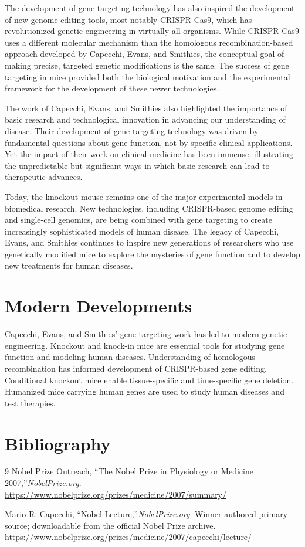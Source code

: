 The development of gene targeting technology has also inspired the development of new genome editing tools, most notably CRISPR-Cas9, which has revolutionized genetic engineering in virtually all organisms. While CRISPR-Cas9 uses a different molecular mechanism than the homologous recombination-based approach developed by Capecchi, Evans, and Smithies, the conceptual goal of making precise, targeted genetic modifications is the same. The success of gene targeting in mice provided both the biological motivation and the experimental framework for the development of these newer technologies.

The work of Capecchi, Evans, and Smithies also highlighted the importance of basic research and technological innovation in advancing our understanding of disease. Their development of gene targeting technology was driven by fundamental questions about gene function, not by specific clinical applications. Yet the impact of their work on clinical medicine has been immense, illustrating the unpredictable but significant ways in which basic research can lead to therapeutic advances.

Today, the knockout mouse remains one of the major experimental models in biomedical research. New technologies, including CRISPR-based genome editing and single-cell genomics, are being combined with gene targeting to create increasingly sophisticated models of human disease. The legacy of Capecchi, Evans, and Smithies continues to inspire new generations of researchers who use genetically modified mice to explore the mysteries of gene function and to develop new treatments for human diseases.


\section{Modern Developments}

Capecchi, Evans, and Smithies' gene targeting work has led to modern genetic engineering. Knockout and knock-in mice are essential tools for studying gene function and modeling human diseases. Understanding of homologous recombination has informed development of CRISPR-based gene editing. Conditional knockout mice enable tissue-specific and time-specific gene deletion. Humanized mice carrying human genes are used to study human diseases and test therapies.


\section{Bibliography}

\begin{thebibliography}{9}
Nobel Prize Outreach, ``The Nobel Prize in Physiology or Medicine 2007,''\emph{NobelPrize.org}.\\
\url{https://www.nobelprize.org/prizes/medicine/2007/summary/}

Mario R. Capecchi, ``Nobel Lecture,''\emph{NobelPrize.org}. Winner-authored primary source; downloadable from the official Nobel Prize archive.\\
\url{https://www.nobelprize.org/prizes/medicine/2007/capecchi/lecture/}
\end{thebibliography}
